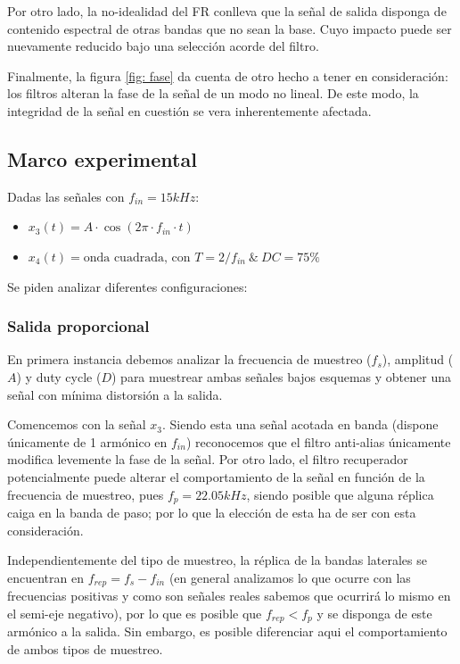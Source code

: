 Por otro lado, la no-idealidad del FR conlleva que la señal de salida disponga de contenido espectral de otras bandas que no sean la base. Cuyo impacto puede ser nuevamente reducido bajo una selección acorde del filtro.

Finalmente, la figura \ref{fig: fase} da cuenta de otro hecho a tener en consideración: los filtros alteran la fase de la señal de un modo no lineal. De este modo, la integridad de la señal en cuestión se vera inherentemente afectada.

\subsection{Marco experimental}
Dadas las señales con $f_{in} = 15kHz$:

\begin{itemize}
    \item $x_3(t) = A \cdot \cos(2\pi \cdot f_{in}\cdot t)$    \item $x_4(t) = \text{onda cuadrada, con } T=2/f_{in} \ \& \ DC=75\%$
\end{itemize}

Se piden analizar diferentes configuraciones:

\subsubsection{Salida proporcional}
En primera instancia debemos analizar la frecuencia de muestreo ($f_s$), amplitud ($A$) y duty cycle ($D$) para muestrear ambas señales bajos esquemas y obtener una señal con mínima distorsión a la salida.


Comencemos con la señal $x_3$. Siendo esta una señal acotada en banda (dispone únicamente de 1 armónico en $f_{in}$) reconocemos que el filtro anti-alias únicamente modifica levemente la fase de la señal. Por otro lado, el filtro recuperador potencialmente puede alterar el comportamiento de la señal en función de la frecuencia de muestreo, pues $f_p = 22.05kHz$, siendo posible que alguna réplica caiga en la banda de paso; por lo que la elección de esta ha de ser con esta consideración. 

Independientemente del tipo de muestreo, la réplica de la bandas laterales se encuentran en $f_{rep} = f_{s} - f_{in}$ (en general analizamos lo que ocurre con las frecuencias positivas y como son señales reales sabemos que ocurrirá lo mismo en el semi-eje negativo), por lo que es posible que $f_{rep} < f_p$ y se disponga de este armónico a la salida. Sin embargo, es posible diferenciar aqui el comportamiento de ambos tipos de muestreo. 

